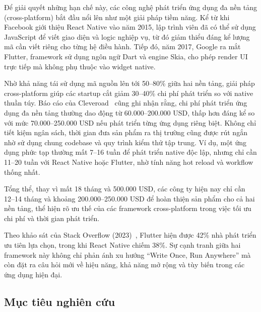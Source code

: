     \hspace*{0.8cm}Để giải quyết những hạn chế này, các công nghệ phát triển ứng dụng đa nền tảng (cross-platform) bắt đầu nổi lên như một giải pháp tiềm năng. Kể từ khi Facebook giới thiệu React Native vào năm 2015, lập trình viên đã có thể sử dụng JavaScript để viết giao diện và logic nghiệp vụ, từ đó giảm thiểu đáng kể lượng mã cần viết riêng cho từng hệ điều hành. Tiếp đó, năm 2017, Google ra mắt Flutter, framework sử dụng ngôn ngữ Dart và engine Skia, cho phép render UI trực tiếp mà không phụ thuộc vào widget native.
\vspace{0.5em}


    \hspace*{0.8cm}Nhờ khả năng tái sử dụng mã nguồn lên tới 50--80\% giữa hai nền tảng, giải pháp cross-platform giúp các startup cắt giảm 30--40\% chi phí phát triển so với native thuần túy. Báo cáo của Cleveroad~\cite{cleveroad} cũng ghi nhận rằng, chi phí phát triển ứng dụng đa nền tảng thường dao động từ 60.000--200.000 USD, thấp hơn đáng kể so với mức 70.000--250.000 USD nếu phát triển từng ứng dụng riêng biệt. Không chỉ tiết kiệm ngân sách, thời gian đưa sản phẩm ra thị trường cũng được rút ngắn nhờ sử dụng chung codebase và quy trình kiểm thử tập trung. Ví dụ, một ứng dụng phức tạp thường mất 7--16 tuần để phát triển native độc lập, nhưng chỉ cần 11--20 tuần với React Native hoặc Flutter, nhờ tính năng hot reload và workflow thống nhất.
\vspace{0.5em}


    \hspace*{0.8cm}Tổng thể, thay vì mất 18 tháng và 500.000 USD, các công ty hiện nay chỉ cần 12--14 tháng và khoảng 200.000--250.000 USD để hoàn thiện sản phẩm cho cả hai nền tảng, thể hiện rõ ưu thế của các framework cross-platform trong việc tối ưu chi phí và thời gian phát triển.
\vspace{0.5em}


    \hspace*{0.8cm}Theo khảo sát của Stack Overflow (2023)~\cite{stackoverflow2023}, Flutter hiện được 42\% nhà phát triển ưu tiên lựa chọn, trong khi React Native chiếm 38\%. Sự cạnh tranh giữa hai framework này không chỉ phản ánh xu hướng ``Write Once, Run Anywhere'' mà còn đặt ra câu hỏi mới về hiệu năng, khả năng mở rộng và tùy biến trong các ứng dụng hiện đại.
\vspace{0.5em}

\subsection{Mục tiêu nghiên cứu}
\renewcommand{\labelitemi}{--}    

